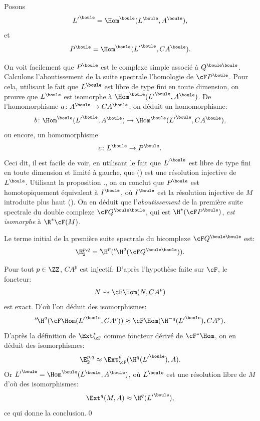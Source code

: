 Posons
\begin{equation} \label{eq:VIII.1.3} {L'}^\boule=\Hom^\boule(L^\boule, A^\boule),
\end{equation}
et
\begin{equation} \label{eq:VIII.1.4} P^\boule=\Hom^\boule({L'}^\boule, CA^\boule).
\end{equation}

On voit facilement que $P^\boule$ est le complexe simple associ\'e \`a $Q^{\boule\boule}$. Calculons l'aboutissement de la suite spectrale \ie l'homologie de ${\cF}P^\boule$. Pour cela, utilisant le fait que $L^\boule$ est libre de type fini en toute dimension, on prouve que $L^\boule$ est isomorphe \`a $\Hom^\boule({L'}^\boule, A^\boule)$. De l'homomorphisme $a\colon A^\boule\to CA^\boule$\pageoriginale, on d\'eduit un homomorphisme:
\[b\colon \Hom^\boule({L'}^\boule, A^\boule)\to \Hom^\boule({L'}^\boule, CA^\boule), \]
ou encore, un homomorphisme
\begin{equation} \label{eq:VIII.1.5} c\colon L^\boule\to P^\boule.
\end{equation}
Ceci dit, il est facile de voir, en utilisant le fait que ${L'}^\boule$ est libre de type fini en toute dimension et limit\'e \`a gauche, que () est une r\'esolution injective de $L^\boule$. Utilisant la proposition ., on en conclut que $P^\boule$ est homotopiquement \'equivalent \`a $I^\boule$, o\`u $I^\boule$ est la r\'esolution injective de $M$ introduite plus haut (). On en d\'eduit que l'\emph{aboutissement} de la premi\`ere suite spectrale du double complexe ${\cF}Q^{\boule\boule}$, qui est $\H^\ast({\cF}P^\boule)$, \emph{est isomorphe} \`a $\R^\ast {\cF}(M)$.

Le terme initial de la premi\`ere suite spectrale du bicomplexe ${\cF}Q^{\boule\boule}$ est:
\[
\E^{p, q}_2 = {'\!\H}^p({''\!\H}^q({\cF}Q^{\boule\boule})).
\]

Pour tout $p\in\ZZ$, $CA^p$ est injectif. D'apr\`es l'hypoth\`ese faite sur ${\cF}$, le foncteur:
\[
N \rightsquigarrow {\cF}\Hom(N, CA^p)\]
est exact. D'o\`u l'on d\'eduit des isomorphismes:
\[
{''\!\H}^q({\cF}\Hom({L'}^\boule, CA^p))\approx {\cF}\Hom(\H^{-q}({L'}^\boule), CA^p).
\]
D'apr\`es la d\'efinition de $\Ext^\ast_{{\cF}}$ comme foncteur d\'eriv\'e de ${\cF}{^\ast}\Hom$, on en d\'eduit des isomorphismes:
\[
\E^{p, q}_2 \approx \Ext^p_{{\cF}}(\H^q({L'}^\boule), A).
\]
Or ${L'}^\boule=\Hom^\boule(L^\boule, A^\boule)$, o\`u $L^\boule$ est une r\'esolution libre de $M$ d'o\`u des isomorphismes:
\[
\Ext^{q}(M, A)\approx \H^q({L'}^\boule),
\]
ce qui donne la conclusion.\qed


